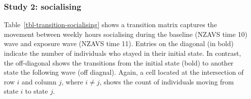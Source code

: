 \documentclass[
  singlecolumn]{article}
\begin{document}
\subsubsection{Study 2: socialising}\label{study-2-socialising}

Table~\ref{tbl-transition-socialising} shows a transition matrix
captures the movement between weekly hours socialising during the
baseline (NZAVS time 10) wave and exposure wave (NZAVS time 11). Entries
on the diagonal (in bold) indicate the number of individuals who stayed
in their initial state. In contrast, the off-diagonal shows the
transitions from the initial state (bold) to another state the following
wave (off diagnal). Again, a cell located at the intersection of row
\(i\) and column \(j\), where \(i \neq j\), shows the count of
individuals moving from state \(i\) to state \(j\).
\end{document}

